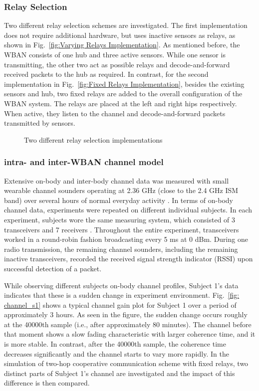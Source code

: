\documentclass[12pt,draftcls,a4paper,onecolumn,journal]{IEEEtran}
\begin{document}
\subsubsection{Relay Selection}
Two different relay selection schemes are investigated. The first implementation does not require additional hardware, but uses inactive sensors as relays, as shown in Fig.~\ref{fig:Varying Relays Implementation}. As mentioned before, the WBAN consists of one hub and three active sensors. While one sensor is transmitting, the other two act as possible relays and decode-and-forward received packets to the hub as required. In contrast, for the second implementation in Fig.~\ref{fig:Fixed Relays Implementation}, besides the existing sensors and hub, two fixed relays are added to the overall configuration of the WBAN system. The relays are placed at the left and right hips respectively. When active, they listen to the channel and decode-and-forward packets transmitted by sensors.
\begin{figure}[]
\centering
{}
\caption{Two different relay selection implementations}
\label{fig:relay selection}
\end{figure}


\subsubsection{intra- and inter-WBAN channel model}
Extensive on-body and inter-body channel data was measured with small wearable channel sounders operating at 2.36 GHz (close to the 2.4 GHz ISM band) over several hours of normal everyday activity \cite{NICTAdata}. In terms of on-body channel data, experiments were repeated on different individual subjects. In each experiment, subjects wore the same measuring system, which consisted of 3 transceivers and 7 receivers \cite{NICTAdata}\cite{Dong2012}. Throughout the entire experiment, transceivers worked in a round-robin fashion broadcasting every 5 ms at 0 dBm. During one radio transmission, the remaining channel sounders, including the remaining inactive transceivers, recorded the received signal strength indicator (RSSI) upon successful detection of a packet.

While observing different subjects on-body channel profiles, Subject 1's data indicates that these is a sudden change in experiment environment. Fig.~\ref{fig: channel_s1} shows a typical channel gain plot for Subject 1 over a period of approximately 3 hours. As seen in the figure, the sudden change occurs roughly at the 40000th sample (i.e., after approximately 80 minutes). The channel before that moment shows a slow fading characteristic with larger coherence time, and it is more stable. In contrast, after the 40000th sample, the coherence time decreases significantly and the channel starts to vary more rapidly. In the simulation of two-hop cooperative communication scheme with fixed relays, two distinct parts of Subject 1's channel are investigated and the impact of this difference is then compared.
\end{document}
